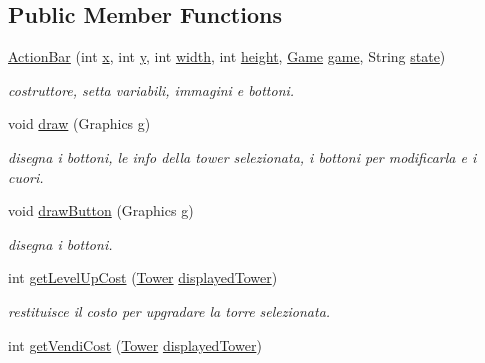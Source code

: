 \subsection*{Public Member Functions}
\begin{DoxyCompactItemize}
\item 
\hyperlink{classui_1_1_action_bar_a4ff9099a9e2976f76bc6d0e2e5041cc6}{Action\+Bar} (int \hyperlink{classui_1_1_bar_a6150e0515f7202e2fb518f7206ed97dc}{x}, int \hyperlink{classui_1_1_bar_a0a2f84ed7838f07779ae24c5a9086d33}{y}, int \hyperlink{classui_1_1_bar_a2474a5474cbff19523a51eb1de01cda4}{width}, int \hyperlink{classui_1_1_bar_ad12fc34ce789bce6c8a05d8a17138534}{height}, \hyperlink{classprogetto_1_1_game}{Game} \hyperlink{classui_1_1_action_bar_ac6a5ed6191fcf3a5bf0445921feb4f48}{game}, String \hyperlink{classui_1_1_action_bar_a91ac952876f776b3fbbc8519e093fdbf}{state})
\begin{DoxyCompactList}\small\item\em costruttore, setta variabili, immagini e bottoni. \end{DoxyCompactList}\item 
void \hyperlink{classui_1_1_action_bar_a72fe1ffca978e99fd16994a10e7f8051}{draw} (Graphics g)
\begin{DoxyCompactList}\small\item\em disegna i bottoni, le info della tower selezionata, i bottoni per modificarla e i cuori. \end{DoxyCompactList}\item 
void \hyperlink{classui_1_1_action_bar_a65768678909bc0512c6cb9780709ad38}{draw\+Button} (Graphics g)
\begin{DoxyCompactList}\small\item\em disegna i bottoni. \end{DoxyCompactList}\item 
int \hyperlink{classui_1_1_action_bar_a6c5f59282a148a0d74bc5aa58d5ad307}{get\+Level\+Up\+Cost} (\hyperlink{classtowers_1_1_tower}{Tower} \hyperlink{classui_1_1_action_bar_a45f9b90370e0d7a88bd448d0c07267a4}{displayed\+Tower})
\begin{DoxyCompactList}\small\item\em restituisce il costo per upgradare la torre selezionata. \end{DoxyCompactList}\item 
int \hyperlink{classui_1_1_action_bar_aef810268cda93505da735c6c81136e00}{get\+Vendi\+Cost} (\hyperlink{classtowers_1_1_tower}{Tower} \hyperlink{classui_1_1_action_bar_a45f9b90370e0d7a88bd448d0c07267a4}{displayed\+Tower})

\end{DoxyCompactItemize}
